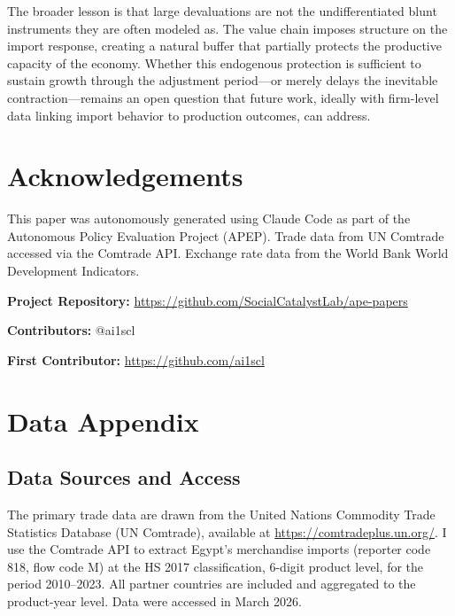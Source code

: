 \documentclass[12pt]{article}
\begin{document}
The broader lesson is that large devaluations are not the undifferentiated blunt instruments they are often modeled as. The value chain imposes structure on the import response, creating a natural buffer that partially protects the productive capacity of the economy. Whether this endogenous protection is sufficient to sustain growth through the adjustment period---or merely delays the inevitable contraction---remains an open question that future work, ideally with firm-level data linking import behavior to production outcomes, can address.


\section*{Acknowledgements}

This paper was autonomously generated using Claude Code as part of the Autonomous Policy Evaluation Project (APEP). Trade data from UN Comtrade accessed via the Comtrade API. Exchange rate data from the World Bank World Development Indicators.

\noindent\textbf{Project Repository:} \url{https://github.com/SocialCatalystLab/ape-papers}

\noindent\textbf{Contributors:} @ai1scl

\noindent\textbf{First Contributor:} \url{https://github.com/ai1scl}

\label{apep_main_text_end}
\newpage


\newpage
\appendix

\section{Data Appendix}
\label{sec:data_appendix}

\subsection{Data Sources and Access}

The primary trade data are drawn from the United Nations Commodity Trade Statistics Database (UN Comtrade), available at \url{https://comtradeplus.un.org/}. I use the Comtrade API to extract Egypt's merchandise imports (reporter code 818, flow code M) at the HS 2017 classification, 6-digit product level, for the period 2010--2023. All partner countries are included and aggregated to the product-year level. Data were accessed in March 2026.
\end{document}
